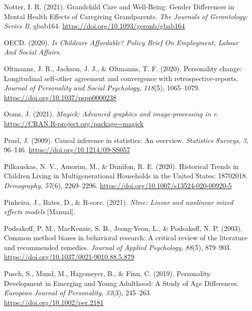 \documentclass[
  english,
  man,floatsintext]{apa7}
\begin{document}
\leavevmode\hypertarget{ref-notterGrandchildCareWellBeing2021}{}%
Notter, I. R. (2021). Grandchild Care and Well-Being: Gender Differences in Mental Health Effects of Caregiving Grandparents. \emph{The Journals of Gerontology: Series B}, gbab164. \url{https://doi.org/10.1093/geronb/gbab164}

\leavevmode\hypertarget{ref-oecdChildcareAffordablePolicy2020}{}%
OECD. (2020). \emph{Is Childcare Affordable? Policy Brief On Employment, Labour And Social Affairs}.

\leavevmode\hypertarget{ref-oltmannsPersonalityChangeLongitudinal2020}{}%
Oltmanns, J. R., Jackson, J. J., \& Oltmanns, T. F. (2020). Personality change: Longitudinal self-other agreement and convergence with retrospective-reports. \emph{Journal of Personality and Social Psychology}, \emph{118}(5), 1065--1079. \url{https://doi.org/10.1037/pspp0000238}

\leavevmode\hypertarget{ref-R-magick}{}%
Ooms, J. (2021). \emph{Magick: Advanced graphics and image-processing in r}. \url{https://CRAN.R-project.org/package=magick}

\leavevmode\hypertarget{ref-pearlCausalInferenceStatistics2009}{}%
Pearl, J. (2009). Causal inference in statistics: An overview. \emph{Statistics Surveys}, \emph{3}, 96--146. \url{https://doi.org/10.1214/09-SS057}

\leavevmode\hypertarget{ref-pilkauskasHistoricalTrendsChildren2020}{}%
Pilkauskas, N. V., Amorim, M., \& Dunifon, R. E. (2020). Historical Trends in Children Living in Multigenerational Households in the United States: 18702018. \emph{Demography}, \emph{57}(6), 2269--2296. \url{https://doi.org/10.1007/s13524-020-00920-5}

\leavevmode\hypertarget{ref-R-nlme}{}%
Pinheiro, J., Bates, D., \& R-core. (2021). \emph{Nlme: Linear and nonlinear mixed effects models} {[}Manual{]}.

\leavevmode\hypertarget{ref-podsakoffCommonMethodBiases2003}{}%
Podsakoff, P. M., MacKenzie, S. B., Jeong-Yeon, L., \& Podsakoff, N. P. (2003). Common method biases in behavioral research: A critical review of the literature and recommended remedies. \emph{Journal of Applied Psychology}, \emph{88}(5), 879--903. \url{https://doi.org/10.1037/0021-9010.88.5.879}

\leavevmode\hypertarget{ref-puschPersonalityDevelopmentEmerging2019}{}%
Pusch, S., Mund, M., Hagemeyer, B., \& Finn, C. (2019). Personality Development in Emerging and Young Adulthood: A Study of Age Differences. \emph{European Journal of Personality}, \emph{33}(3), 245--263. \url{https://doi.org/10.1002/per.2181}
\end{document}
